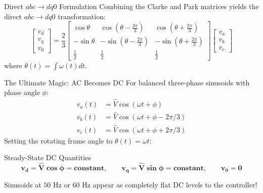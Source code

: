 \begin{frame}{Direct $abc \to dq0$ Formulation}
    Combining the Clarke and Park matrices yields the direct $abc \to dq0$ transformation:
    \begin{equation}
        \begin{bmatrix} v_d \\ v_q \\ v_0 \end{bmatrix}
        =
        \frac{2}{3}
        \begin{bmatrix}
            \cos\theta & \cos(\theta - \frac{2\pi}{3}) & \cos(\theta + \frac{2\pi}{3}) \\
            -\sin\theta & -\sin(\theta - \frac{2\pi}{3}) & -\sin(\theta + \frac{2\pi}{3}) \\
            \frac{1}{2} & \frac{1}{2} & \frac{1}{2}
        \end{bmatrix}
        \begin{bmatrix} v_a \\ v_b \\ v_c \end{bmatrix}
    \end{equation}
    where $\theta(t) = \int \omega(t) dt$.
\end{frame}

\begin{frame}{The Ultimate Magic: AC Becomes DC}
    For balanced three-phase sinusoids with phase angle $\phi$:
    \begin{align}
        v_a(t) &= \hat{V} \cos(\omega t + \phi) \\
        v_b(t) &= \hat{V} \cos(\omega t + \phi - 2\pi/3) \\
        v_c(t) &= \hat{V} \cos(\omega t + \phi + 2\pi/3)
    \end{align}
    Setting the rotating frame angle to $\theta(t) = \omega t$:
    \begin{alertblock}{Steady-State DC Quantities}
        \begin{equation}
            \mathbf{v_d = \hat{V} \cos\phi = \text{constant}}, \qquad \mathbf{v_q = \hat{V} \sin\phi = \text{constant}}, \qquad \mathbf{v_0 = 0}
        \end{equation}
    \end{alertblock}
    Sinusoids at $50\text{ Hz}$ or $60\text{ Hz}$ appear as completely flat DC levels to the controller!
\end{frame}

